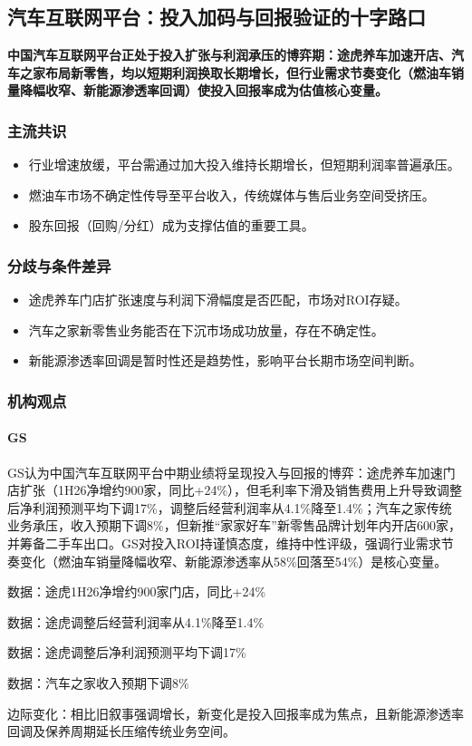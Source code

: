 \documentclass[11pt]{ctexart}
\begin{document}
\subsection{汽车互联网平台：投入加码与回报验证的十字路口}
\textbf{中国汽车互联网平台正处于投入扩张与利润承压的博弈期：途虎养车加速开店、汽车之家布局新零售，均以短期利润换取长期增长，但行业需求节奏变化（燃油车销量降幅收窄、新能源渗透率回调）使投入回报率成为估值核心变量。}
\subsubsection*{主流共识}
\begin{itemize}
  \item 行业增速放缓，平台需通过加大投入维持长期增长，但短期利润率普遍承压。
  \item 燃油车市场不确定性传导至平台收入，传统媒体与售后业务空间受挤压。
  \item 股东回报（回购/分红）成为支撑估值的重要工具。
\end{itemize}
\subsubsection*{分歧与条件差异}
\begin{itemize}
  \item 途虎养车门店扩张速度与利润下滑幅度是否匹配，市场对ROI存疑。
  \item 汽车之家新零售业务能否在下沉市场成功放量，存在不确定性。
  \item 新能源渗透率回调是暂时性还是趋势性，影响平台长期市场空间判断。
\end{itemize}
\subsubsection*{机构观点}
\paragraph{GS} GS认为中国汽车互联网平台中期业绩将呈现投入与回报的博弈：途虎养车加速门店扩张（1H26净增约900家，同比+24\%），但毛利率下滑及销售费用上升导致调整后净利润预测平均下调17\%，调整后经营利润率从4.1\%降至1.4\%；汽车之家传统业务承压，收入预期下调8\%，但新推“家家好车”新零售品牌计划年内开店600家，并筹备二手车出口。GS对投入ROI持谨慎态度，维持中性评级，强调行业需求节奏变化（燃油车销量降幅收窄、新能源渗透率从58\%回落至54\%）是核心变量。
{\small\color{refgray}数据：途虎1H26净增约900家门店，同比+24\%\par}
{\small\color{refgray}数据：途虎调整后经营利润率从4.1\%降至1.4\%\par}
{\small\color{refgray}数据：途虎调整后净利润预测平均下调17\%\par}
{\small\color{refgray}数据：汽车之家收入预期下调8\%\par}
{\small\color{refgray}边际变化：相比旧叙事强调增长，新变化是投入回报率成为焦点，且新能源渗透率回调及保养周期延长压缩传统业务空间。\par}
\end{document}
